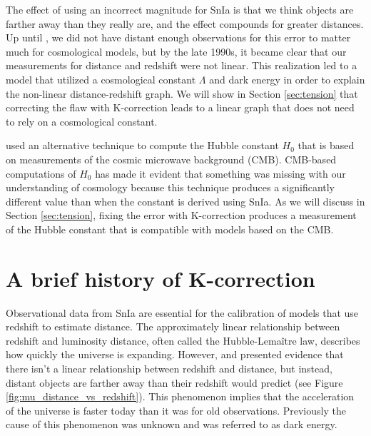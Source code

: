 \documentclass[linenumbers]{aastex631}
\begin{document}
The effect of using an incorrect magnitude for SnIa is that we think objects
are farther away than they really are, and the effect compounds for greater
distances. Up until \citet{riess1998}, we did not have distant enough
observations for this error to matter much for cosmological models, but by the
late 1990s, it became clear that our measurements for distance and redshift were
not linear. This realization led to a model that utilized a cosmological
constant $\Lambda$ and dark energy in order to explain the non-linear
distance-redshift graph. We will show in Section \ref{sec:tension} that
correcting the flaw with K-correction leads to a linear graph that does not
need to rely on a cosmological constant.

\citet{planck2015} used an alternative technique to compute the Hubble constant
$H_0$ that is based on measurements of the cosmic microwave background (CMB).
CMB-based computations of $H_0$ has made it evident that something was missing
with our understanding of cosmology because this technique produces a
significantly different value than when the constant is derived using SnIa.  As
we will discuss in Section \ref{sec:tension}, fixing the error with
K-correction produces a measurement of the Hubble constant that is compatible
with models based on the CMB.

\section{A brief history of K-correction}
\label{sec:history}

Observational data from SnIa are essential for the calibration of models that
use redshift to estimate distance. The approximately linear relationship
between redshift and luminosity distance, often called the Hubble-Lema\^{i}tre law,
describes how quickly the universe is expanding. However, \citet{riess1998}
and \citet{perlmutter1999} presented evidence that there isn't a linear
relationship between redshift and distance, but instead, distant objects are
farther away than their redshift would predict (see Figure
\ref{fig:mu_distance_vs_redshift}). This phenomenon implies that the
acceleration of the universe is faster today than it was for old observations.
Previously the cause of this phenomenon was unknown and was referred to as dark
energy.
\end{document}
